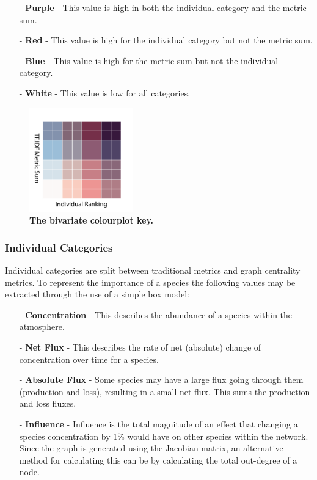 \begin{itemize}
\item[-] \textbf{Purple} - This value is high in both the individual category and the metric sum. 
\item[-] \textbf{Red} - This value is high for the individual category but not the metric sum. 
\item[-] \textbf{Blue} - This value is high for the metric sum but not the individual category. 
\item[-] \textbf{White} - This value is low for all categories. 
\end{itemize}



\begin{figure}[H]
     \centering
         \includegraphics[width=0.4\textwidth,angle=45]{figures_c3/mlpregressor/cbar.pdf}
        \caption{ \textbf{The bivariate colourplot key.} }
        \label{fig:cmap}
\end{figure}


\subsubsection{Individual Categories}
Individual categories are split between traditional metrics and graph centrality metrics. To represent the importance of a species the following values may be extracted through the use of a simple box model:

\begin{itemize}
\item[-] \textbf{Concentration} - This describes the abundance of a species within the atmosphere. 
\item[-] \textbf{Net Flux} - This describes the rate of net (absolute) change of concentration over time for a species. 
\item[-] \textbf{Absolute Flux} - Some species may have a large flux going through them (production and loss), resulting in a small net flux. This sums the production and loss fluxes. 
\item[-] \textbf{Influence} - Influence is the total magnitude of an effect that changing a species concentration by 1\% would have on other species within the network. Since the graph is generated using the Jacobian matrix, an alternative method for calculating this can be by calculating the total out-degree of a node.  
\end{itemize}



